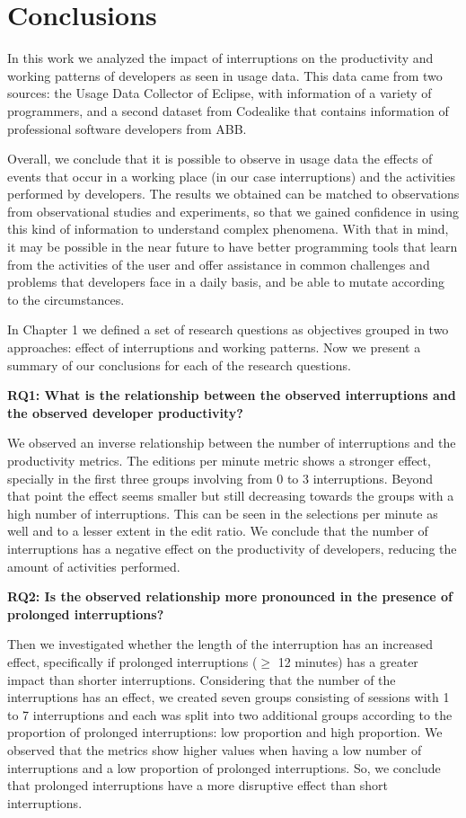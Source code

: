 \chapter{Conclusions}

In this work we analyzed the impact of interruptions on the productivity and working patterns of developers as seen in usage data. This data came from two sources: the Usage Data Collector of Eclipse, with information of a variety of programmers, and a second dataset from Codealike that contains information of professional software developers from ABB.

Overall, we conclude that it is possible to observe in usage data the effects of events that occur in a working place (in our case interruptions) and the activities performed by developers. The results we obtained can be matched to observations from observational studies and experiments, so that we gained confidence in using this kind of information to understand complex phenomena. With that in mind, it may be possible in the near future to have better programming tools that learn from the activities of the user and offer assistance in common challenges and problems that developers face in a daily basis, and be able to mutate according to the circumstances.

In Chapter 1 we defined a set of research questions as objectives grouped in two approaches: effect of interruptions and working patterns. Now we present a summary of our conclusions for each of the research questions. 

\textbf{RQ1: What is the relationship between the observed interruptions and the observed developer productivity?} 

We observed an inverse relationship between the number of interruptions and the productivity metrics. The editions per minute metric shows a stronger effect, specially in the first three groups involving from 0 to 3 interruptions. Beyond that point the effect seems smaller but still decreasing towards the groups with a high number of interruptions. This can be seen in the selections per minute as well and to a lesser extent in the edit ratio. We conclude that the number of interruptions has a negative effect on the productivity of developers, reducing the amount of activities performed.

\textbf{RQ2: Is the observed relationship more pronounced in the presence of prolonged interruptions?}

Then we investigated whether the length of the interruption has an increased effect, specifically if prolonged interruptions ($\geq$ 12 minutes) has a greater impact than shorter interruptions. Considering that the number of the interruptions has an effect, we created seven groups consisting of sessions with 1 to 7 interruptions and each was split into two additional groups according to the proportion of prolonged interruptions: low proportion and high proportion. We observed that the metrics show higher values when having a low number of interruptions and a low proportion of prolonged interruptions. So, we conclude that prolonged interruptions have a more disruptive effect than short interruptions.


